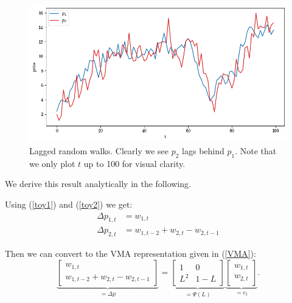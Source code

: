 \documentclass[a4paper, oneside, notitlepage]{book}
\begin{document}
\begin{figure}[htpb]
    \centering
    \includegraphics[width=1.0\textwidth]{./images/lagged_walk.png}
    \caption{Lagged random walks. Clearly we see $p_2$ lags behind $p_1$. Note that we only plot $t$ up to 100 for visual clarity.}
\end{figure}

We derive this result analytically in the following.

Using (\ref{toy1}) and (\ref{toy2}) we get:
\begin{align*}
    \Delta p_{1, t} &= w_{1, t} \\
    \Delta p_{2, t} &= w_{1, t-2} + w_{2, t} - w_{2, t-1}
\end{align*}

Then we can convert to the VMA representation given in (\ref{VMA}):
\[
    \underbrace{
    \begin{bmatrix}
    w_{1,t} \\
    w_{1,t-2} + w_{2,t} - w_{2,t-1}
    \end{bmatrix} 
    }_{= \Delta p}
    =
    \underbrace{
    \begin{bmatrix}
    1 & 0 \\
    L^{2}  & 1 - L
    \end{bmatrix}
    }_{= \Psi(L)}
    \underbrace{
    \begin{bmatrix}
    w_{1,t} \\
    w_{2,t}
    \end{bmatrix}
    }_{=e_t}
.\]
\end{document}

